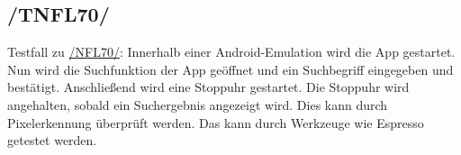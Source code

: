\subsection*{/TNFL70/}

\label{/TNFL70/} Testfall zu \hyperref[/NFL70/]{/NFL70/}: Innerhalb einer \Gls{Android}-\Gls{Emulation} wird die App gestartet.
Nun wird die Suchfunktion der App geöffnet und ein Suchbegriff eingegeben und bestätigt.
Anschließend wird eine Stoppuhr gestartet.
Die Stoppuhr wird angehalten, sobald ein Suchergebnis angezeigt wird.
Dies kann durch Pixelerkennung überprüft werden.
Das kann durch Werkzeuge wie \Gls{Espresso} getestet werden.